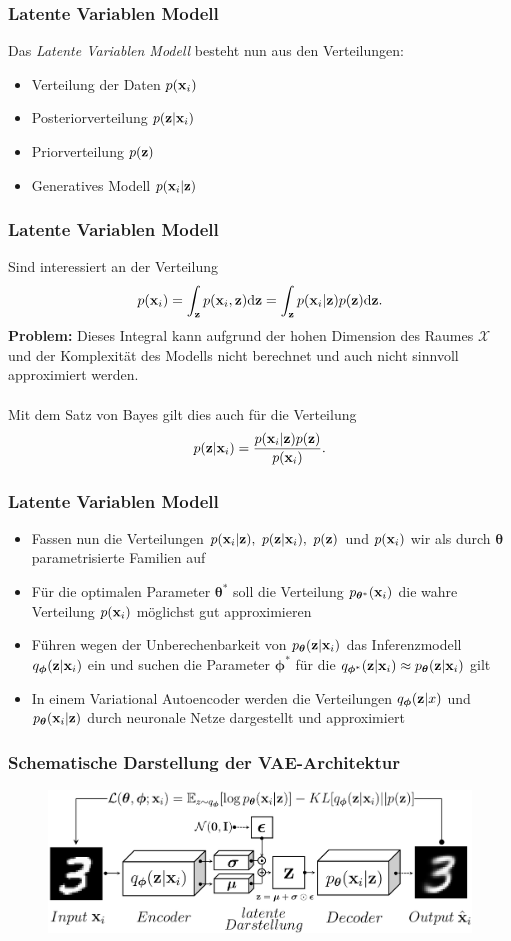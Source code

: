 \begin{frame}
	\frametitle{Latente Variablen Modell}
	Das \emph{Latente Variablen Modell} besteht nun aus den Verteilungen:
	\begin{itemize}
		\item Verteilung der Daten $p(\mathbf{x}_i)$
		\item Posteriorverteilung $p(\mathbf{z}|\mathbf{x}_i)$
		\item Priorverteilung $p(\mathbf{z})$
		\item Generatives Modell $p(\mathbf{x}_i|\mathbf{z})$
	\end{itemize}
\end{frame}

\begin{frame}
	\frametitle{Latente Variablen Modell}
	Sind interessiert an der Verteilung
	\[p(\mathbf{x}_i)= \int_{\mathbf{z}} p(\mathbf{x}_i,\mathbf{z}) \mathrm{d}\textbf{z} = \int_{\mathbf{z}} p(\mathbf{x}_i|\mathbf{z})p(\mathbf{z}) \mathrm{d}\mathbf{z}.\]
	\textbf{Problem:} Dieses Integral kann aufgrund der hohen Dimension des Raumes $\mathcal{X}$ und der Komplexität des Modells 
	nicht berechnet und auch nicht sinnvoll approximiert werden. \\ \ 
	\\
	Mit dem Satz von Bayes gilt dies auch für die Verteilung
	\[p(\mathbf{z}|\mathbf{x}_i)= \frac{p(\mathbf{x}_i|\mathbf{z})p(\mathbf{z})}{p(\mathbf{x}_i)}.\]
\end{frame}

\begin{frame}
	\frametitle{Latente Variablen Modell}
		\begin{itemize}
		\item Fassen nun die Verteilungen $p(\x|\z),\ p(\z|\x),\ p(\z)$ und $p(\mathbf{x}_i)$ wir als durch ${\boldsymbol\theta}$ parametrisierte Familien auf 
		\item Für die optimalen Parameter $\boldsymbol\theta^{*}$ soll die Verteilung  $p_{\boldsymbol\theta^{*}}(\mathbf{x}_i)$ die wahre Verteilung $p(\mathbf{x}_i)$ 	möglichst gut approximieren
		\item Führen wegen der Unberechenbarkeit von $p_{\boldsymbol\theta}(\mathbf{z}|\mathbf{x}_i)$ das Inferenzmodell $q_{\boldsymbol\phi}(\mathbf{z}|\mathbf{x}_i)$ ein und suchen die Parameter $\boldsymbol\phi^{*}$ für die $q_{\boldsymbol\phi^{*}}(\mathbf{z}|\mathbf{x}_i) \approx p_{\boldsymbol\theta}(\mathbf{z}|\mathbf{x}_i)$ gilt 
		\item In einem Variational Autoencoder werden die Verteilungen $q_{\boldsymbol\phi}(\mathbf{z}|x)$ und $p_{\boldsymbol\theta}(\mathbf{x}_i|\mathbf{z})$ durch neuronale Netze dargestellt und approximiert
	\end{itemize}
\end{frame}

\begin{frame}
	\frametitle{Schematische Darstellung der VAE-Architektur}
	\begin{figure}[htbp!]
		\includegraphics[scale=0.27]{Bilder/VAE-Modell.PNG}
	\end{figure}
\end{frame}